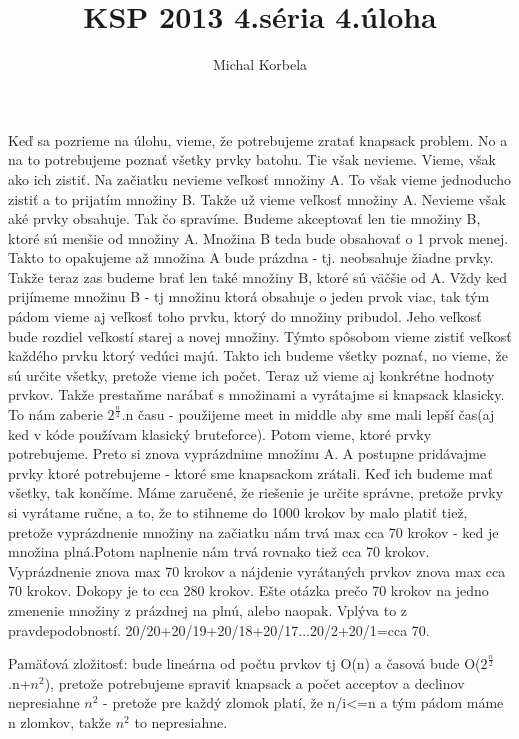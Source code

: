 \documentclass[a4paper,11pt]{article}
\title{KSP 2013 4.séria 4.úloha}
\author{Michal Korbela}
\begin{document}
Keď sa pozrieme na úlohu, vieme, že potrebujeme zratať knapsack problem.
No a na to potrebujeme poznať všetky prvky batohu. Tie však nevieme. Vieme, však ako ich zistiť. Na začiatku nevieme veľkosť množiny A. To však vieme jednoducho zistiť a to prijatím množiny B. Takže už vieme veľkosť množiny A. Nevieme však aké prvky obsahuje. Tak čo spravíme. Budeme akceptovať len tie množiny B, ktoré sú menšie od množiny A. Množina B teda bude obsahovať o 1 prvok menej. Takto to opakujeme až množina A bude prázdna - tj. neobsahuje žiadne prvky. Takže teraz zas budeme brať len také množiny B, ktoré sú väčšie od A. Vždy ked prijímeme množinu B - tj množinu ktorá obsahuje o jeden prvok viac, tak tým pádom vieme aj veľkosť toho prvku, ktorý do množiny pribudol. Jeho veľkosť bude rozdiel veľkostí starej a novej množiny.
Týmto spôsobom vieme zistiť veľkosť každého prvku ktorý vedúci majú. Takto ich budeme všetky poznať, no vieme, že sú určite všetky, pretože vieme ich počet. Teraz už vieme aj konkrétne hodnoty prvkov. Takže prestaňme narábať s množinami a vyrátajme si knapsack klasicky. To nám zaberie $2^{\frac{n}{2}}$.n času - použijeme meet in middle aby sme mali lepší čas(aj ked v kóde používam klasický bruteforce).
Potom vieme, ktoré prvky potrebujeme. Preto si znova vyprázdnime množinu A. A postupne pridávajme prvky ktoré potrebujeme - ktoré sme knapsackom zrátali. Keď ich budeme mať všetky, tak končíme. Máme zaručené, že riešenie je určite správne, pretože prvky si vyrátame ručne, a to, že to stihneme do 1000 krokov by malo platiť tiež, pretože vyprázdnenie množiny na začiatku nám trvá max cca 70 krokov - ked je množina plná.Potom naplnenie nám trvá rovnako tiež cca 70 krokov. Vyprázdnenie znova max 70 krokov a nájdenie vyrátaných prvkov znova max cca 70 krokov. Dokopy je to cca 280 krokov. Ešte otázka prečo 70 krokov na jedno zmenenie množiny z prázdnej na plnú, alebo naopak. Vplýva to z pravdepodobností. 20/20+20/19+20/18+20/17...20/2+20/1=cca 70.

Pamäťová zložitosť: bude lineárna od počtu prvkov tj O(n) a časová bude O($2^{\frac{n}{2}}$.n+$n^2$), pretože potrebujeme spraviť knapsack a počet acceptov a declinov nepresiahne $n^2$ - pretože pre každý zlomok platí, že n/i<=n a tým pádom máme n zlomkov, takže $n^2$ to nepresiahne.
\end{document}
